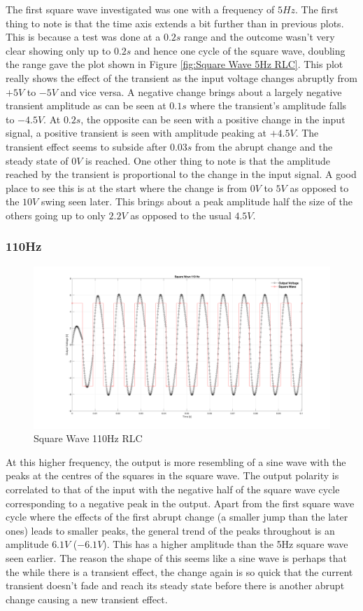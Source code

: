 \documentclass[a4paper, 12pt]{article}
\begin{document}
The first square wave investigated was one with a frequency of $5Hz$. The first thing to note is that the time axis extends a bit further than in previous plots. This is because a test was done at a $0.2s$ range and the outcome wasn't very clear showing only up to $0.2s$ and hence one cycle of the square wave, doubling the range gave the plot shown in Figure \ref{fig:Square Wave 5Hz RLC}. This plot really shows the effect of the transient as the input voltage changes abruptly from $+5V$ to $-5V$ and vice versa. A negative change brings about a largely negative transient amplitude as can be seen at $0.1s$ where the transient's amplitude falls to $-4.5V$. At $0.2s$, the opposite can be seen with a positive change in the input signal, a positive transient is seen with amplitude peaking at $+4.5V$. The transient effect seems to subside after $0.03s$ from the abrupt change and the steady state of $0V$ is reached. One other thing to note is that the amplitude reached by the transient is proportional to the change in the input signal. A good place to see this is at the start where the change is from $0V$ to $5V$ as opposed to the $10V$ swing seen later. This brings about a peak amplitude half the size of the others going up to only $2.2V$ as opposed to the usual $4.5V$.

\subsubsection{110Hz}

\begin{figure}[h]
\centering
\includegraphics[width=\textwidth]{ex3/Square_Wave_110_Hz.png}
\caption{Square Wave 110Hz RLC}
\end{figure}

At this higher frequency, the output is more resembling of a sine wave with the peaks at the centres of the squares in the square wave. The output polarity is correlated to that of the input with the negative half of the square wave cycle corresponding to a negative peak in the output. Apart from the first square wave cycle where the effects of the first abrupt change (a smaller jump than the later ones) leads to smaller peaks, the general trend of the peaks throughout is an amplitude $6.1V$ ($-6.1V$). This has a higher amplitude than the 5Hz square wave seen earlier. The reason the shape of this seems like a sine wave is perhaps that the while there is a transient effect, the change again is so quick that the current transient doesn't fade and reach its steady state before there is another abrupt change causing a new transient effect.
\end{document}
